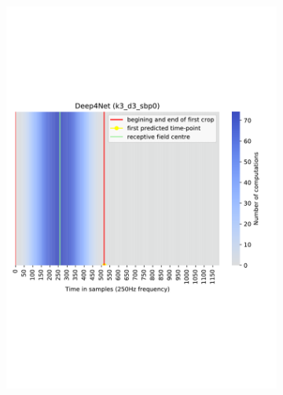 \begin{figure}[!htpb]
\centering
\begin{subfigure}[b]{0.48\textwidth}
   \includegraphics[width=0.95\linewidth]{img/ch3/deep4net-receptive-field}
   \caption{}
\end{subfigure}
\begin{subfigure}[b]{0.48\textwidth}

\end{subfigure}
\end{figure}
